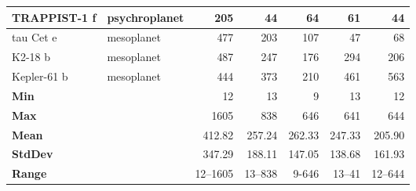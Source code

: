\documentclass[fleqn,usenatbib]{mnras}
\begin{document}
\begin{table*}
{\begin{tabular}{|l|l|r|r|r|r|r|}
TRAPPIST-1 f    & psychroplanet                                 & 205                                                                 & 44                                   & 64                                 & 61                                    & 44                                 \\ \hline
tau Cet e       & mesoplanet                                     & 477                                                               & 203                                  & 107                                & 47                                    & 68                                 \\ \hline
K2-18 b         & mesoplanet                                    & 487                                                               & 247                                  & 176                                & 294                                   & 206                                \\ \hline
Kepler-61 b     & mesoplanet                                    & 444                                                                & 373                                  & 210                                & 461                                   & 563                                \\ \hline
\textbf{Min}    &                                                & 12                                                          & 13                                   & 9                                  & 13                                    & 12                                 \\ \hline
\textbf{Max}    &                                      & 1605                                                              & 838                                  & 646                                & 641                                  & 644                                \\ \hline
\textbf{Mean}   &        & 412.82       & 257.24        & 262.33      & 247.33    & 205.90    \\ 
\hline
\textbf{StdDev} &       & 347.29    & 188.11              & 147.05        & 138.68        & 161.93     \\ 
\hline
\textbf{Range}  &    & 12--1605      & 13--838    & 9-646  & 13--41 & 12--644    \\ 
\hline
\end{tabular}
}
\end{table*}
\end{document}
